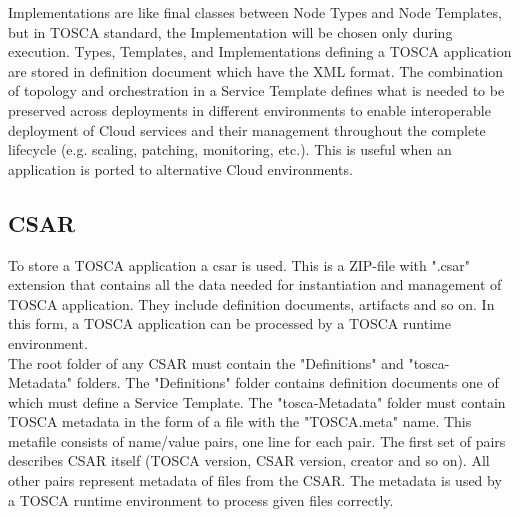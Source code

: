 Implementations are like final classes between Node Types and Node Templates, but in TOSCA standard, the Implementation will be chosen only during execution.
Types, Templates, and Implementations defining a TOSCA application are stored in definition document which have the XML format. %
The combination of topology and orchestration in a Service Template defines what is needed to be preserved across deployments in different environments to enable interoperable deployment of Cloud services and their management throughout the complete lifecycle (e.g. scaling, patching, monitoring, etc.).
This is useful when an application is ported to alternative Cloud environments.~\cite{TOSCA-v1.0_book} \\

%
\subsection*{CSAR} 
%
To store a TOSCA application a \gls{csar}\label{sec:csar} is used.
This is a ZIP-file with ".csar" extension that contains all the data needed for instantiation and management of TOSCA application.
They include definition documents, artifacts and so on.
In this form, a TOSCA application can be processed by a TOSCA runtime environment.\\
The root folder of any CSAR must contain the "Definitions" and "\gls{tosca}-Metadata" folders.
The "Definitions" folder contains definition documents one of which must define a Service Template.
The "\gls{tosca}-Metadata" folder must contain TOSCA metadata in the form of a file with the "TOSCA.meta" name.
This metafile consists of name/value pairs, one line for each pair. 
The first set of pairs describes CSAR itself (TOSCA version, CSAR version, creator and so on). 
All other pairs represent metadata of files from the CSAR. 
The metadata is used by a TOSCA runtime environment to process given files correctly.\\
%

